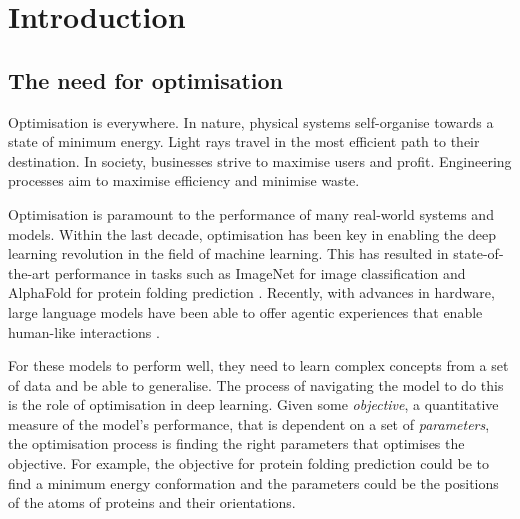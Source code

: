 \chapter{Introduction}
\label{chap:introduction}


\section{The need for optimisation}
\label{sec:optimisation_need}

Optimisation is everywhere. In nature, physical systems self-organise towards a state of minimum energy. Light rays travel in the most efficient path to their destination. In society, businesses strive to maximise users and profit. Engineering processes aim to maximise efficiency and minimise waste.

Optimisation is paramount to the performance of many real-world systems and models. Within the last decade, optimisation has been key in enabling the deep learning revolution in the field of machine learning. This has resulted in state-of-the-art performance in tasks such as ImageNet for image classification \citep{imagenet} and AlphaFold for protein folding prediction \citep{alphafold}. Recently, with advances in hardware, large language models have been able to offer agentic experiences that enable human-like interactions \citep{chowdhery2023palm}. 

For these models to perform well, they need to learn complex concepts from a set of data and be able to generalise. The process of navigating the model to do this is the role of optimisation in deep learning. Given some \textit{objective}, a quantitative measure of the model's performance, that is dependent on a set of \textit{parameters}, the optimisation process is finding the right parameters that optimises the objective. For example, the objective for protein folding prediction could be to find a minimum energy conformation and the parameters could be the positions of the atoms of proteins and their orientations. 

